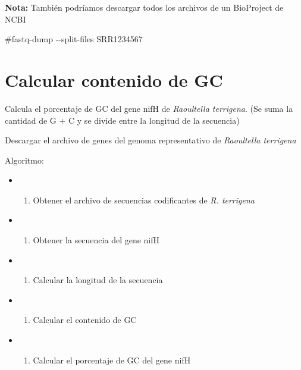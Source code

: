 \documentclass[
]{book}
\newenvironment{Shaded}{\begin{snugshade}}{\end{snugshade}}
\newcommand{\NormalTok}[1]{#1}
\providecommand{\tightlist}{%
  \setlength{\itemsep}{0pt}\setlength{\parskip}{0pt}}
\begin{document}
\textbf{Nota:} También podríamos descargar todos los archivos de un BioProject de NCBI

\begin{Shaded}
\begin{Highlighting}[]
\NormalTok{\#fastq{-}dump {-}{-}split{-}files SRR1234567}
\end{Highlighting}
\end{Shaded}

\section{Calcular contenido de GC}\label{calcular-contenido-de-gc}

Calcula el porcentaje de GC del gene nifH de \emph{Raoultella terrigena}. (Se suma la cantidad de G + C y se divide entre la longitud de la secuencia)

Descargar el archivo de genes del genoma representativo de \emph{Raoultella terrigena}

Algoritmo:

\begin{itemize}
\tightlist
\item
  \begin{enumerate}
  \def\labelenumi{\arabic{enumi}.}
  \tightlist
  \item
    Obtener el archivo de secuencias codificantes de \emph{R. terrigena}
  \end{enumerate}
\item
  \begin{enumerate}
  \def\labelenumi{\arabic{enumi}.}
  \setcounter{enumi}{1}
  \tightlist
  \item
    Obtener la secuencia del gene nifH
  \end{enumerate}
\item
  \begin{enumerate}
  \def\labelenumi{\arabic{enumi}.}
  \setcounter{enumi}{2}
  \tightlist
  \item
    Calcular la longitud de la secuencia
  \end{enumerate}
\item
  \begin{enumerate}
  \def\labelenumi{\arabic{enumi}.}
  \setcounter{enumi}{3}
  \tightlist
  \item
    Calcular el contenido de GC
  \end{enumerate}
\item
  \begin{enumerate}
  \def\labelenumi{\arabic{enumi}.}
  \setcounter{enumi}{4}
  \tightlist
  \item
    Calcular el porcentaje de GC del gene nifH
  \end{enumerate}
\end{itemize}
\end{document}
